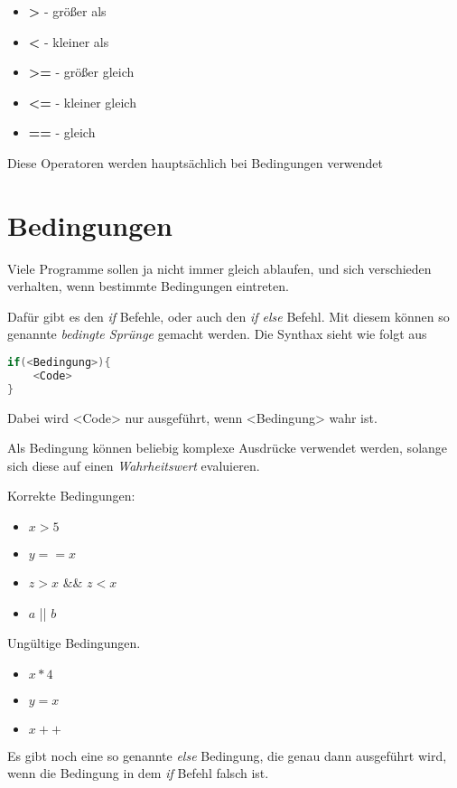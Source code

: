 \documentclass[c_worksheet.tex]{subfiles}
\begin{document}
\begin{itemize}
	\item \textbf{>} - größer als
	\item \textbf{<} - kleiner als
	\item \textbf{>=} - größer gleich
	\item \textbf{<=} - kleiner gleich
	\item \textbf{==} - gleich
\end{itemize}

Diese Operatoren werden hauptsächlich bei Bedingungen verwendet

\section{Bedingungen}

Viele Programme sollen ja nicht immer gleich ablaufen, und sich verschieden verhalten, wenn bestimmte Bedingungen eintreten.

Dafür gibt es den \emph{if} Befehle, oder auch den \emph{if else} Befehl. Mit diesem können so genannte \emph{bedingte Sprünge} gemacht werden. Die Synthax sieht wie folgt aus

\begin{lstlisting}[language=c]
if(<Bedingung>){
	<Code>
}
\end{lstlisting}

Dabei wird <Code> nur ausgeführt, wenn <Bedingung> wahr ist.

Als Bedingung können beliebig komplexe Ausdrücke verwendet werden, solange sich diese auf einen \emph{Wahrheitswert} evaluieren.

Korrekte Bedingungen:

\begin{itemize}
	\item \(x > 5\)
	\item \(y == x\)
	\item \(z > x\) \&\& \(z < x\)
	\item \(a\) || \(b\)
\end{itemize}

Ungültige Bedingungen.

\begin{itemize}
	\item \(x * 4\)
	\item \(y = x\)
	\item \(x++\)
\end{itemize}

Es gibt noch eine so genannte \emph{else} Bedingung, die genau dann ausgeführt wird, wenn die Bedingung in dem \emph{if} Befehl falsch ist.
\end{document}
